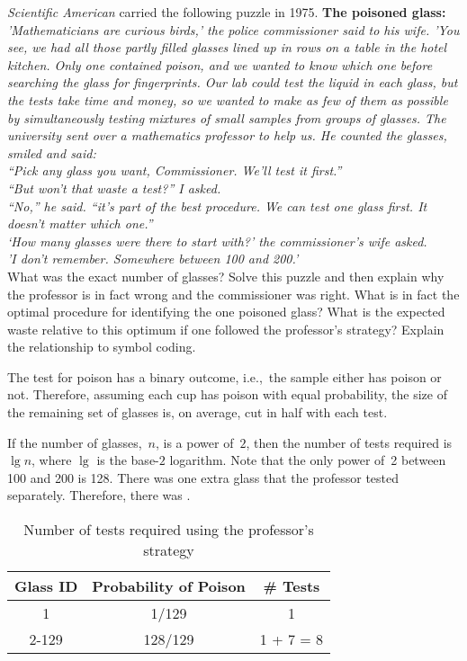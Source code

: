 \newpage
\begin{problem}{5}{8}{30}
  \textit{Scientific American} carried the following puzzle in 1975.
  \problemspace
  \textbf{The poisoned glass:} \textnormal{\textit{'Mathematicians are curious birds,' the police commissioner said to his wife. 'You see, we had all those partly filled glasses lined up in rows on a table in the hotel kitchen. Only one contained poison, and we wanted to know which one before searching the glass for fingerprints.  Our lab could test the liquid in each glass, but the tests take time and money, so we wanted to make as few of them as possible by simultaneously testing mixtures of small samples from groups of glasses.  The university sent over a mathematics professor to help us.  He counted the glasses, smiled and said: \\ ``Pick any glass you want, Commissioner. We'll test it first.'' \\ ``But won't that waste a test?'' I asked. \\ ``No,'' he said. ``it's part of the best procedure.  We can test one glass first.  It doesn't matter which one.'' \\ `How many glasses were there to start with?' the commissioner's wife asked. \\ 'I don't remember. Somewhere between 100 and 200.'} \\What was the exact number of glasses?}
  \problemspace
  Solve this puzzle and then explain why the professor is in fact wrong and the commissioner was right.  What is in fact the optimal procedure for identifying the one poisoned glass?  What is the expected waste relative to this optimum if one followed the professor's strategy?  Explain the relationship to symbol coding.
\end{problem}

The test for poison has a binary outcome, i.e.,~the sample either has poison or not.  Therefore, assuming each cup has poison with equal probability, the size of the remaining set of glasses is, on average, cut in half with each test.

If the number of glasses,~$n$, is a power of~$2$, then the number of tests required is $\lg n$, where $\lg$ is the base-$2$ logarithm.  Note that the only power of~2 between 100 and 200 is 128.  There was one extra glass that the professor tested separately.  Therefore, there was .

\begin{table}[h]
  \centering
  \begin{tabular}{c|c|c}
    \hline
    Glass ID & Probability of Poison & \# Tests  \\\hline
    1        & 1/129                 & 1         \\\hline
    2-129    & 128/129               & 1 + 7 = 8 \\\hline
  \end{tabular}
  \caption{Number of tests required using the professor's strategy}\label{tab:problem5.9.20-Prof}
\end{table}

